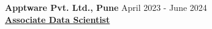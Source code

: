 \documentclass[10pt]{article}
\begin{document}
\begin{itemize}[left=0pt, itemsep=0pt]

\end{itemize}
\textbf{Apptware Pvt. Ltd., Pune} \hfill April 2023 - June 2024 \\
\textbf{\underline{Associate Data Scientist}}
\end{document}
